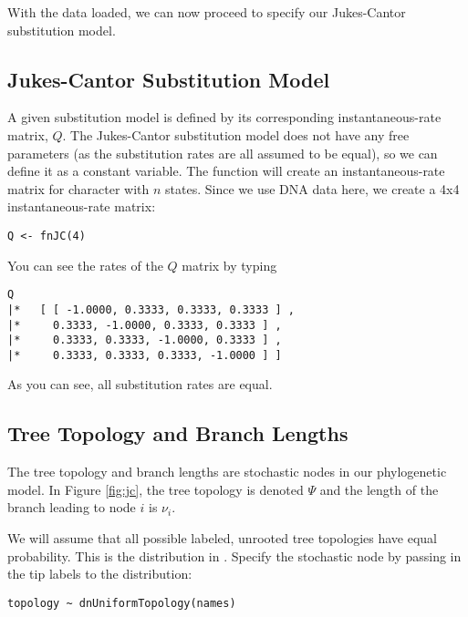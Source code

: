 With the data loaded, we can now proceed to specify our Jukes-Cantor substitution model.

\subsection{Jukes-Cantor Substitution Model}

A given substitution model is defined by its corresponding instantaneous-rate matrix, $Q$.
The Jukes-Cantor substitution model does not have any free parameters (as the substitution rates are all assumed to be equal), so we can define it as a constant variable.
The function  will create an instantaneous-rate matrix for character with $n$ states.
Since we use DNA data here, we create a 4x4 instantaneous-rate matrix:
{\tt \begin{snugshade*}
\begin{lstlisting}
Q <- fnJC(4) 
\end{lstlisting}
\end{snugshade*}}
You can see the rates of the $Q$ matrix by typing
{\tt \begin{snugshade*}
\begin{lstlisting}
Q
|*   [ [ -1.0000, 0.3333, 0.3333, 0.3333 ] ,
|*     0.3333, -1.0000, 0.3333, 0.3333 ] ,
|*     0.3333, 0.3333, -1.0000, 0.3333 ] ,
|*     0.3333, 0.3333, 0.3333, -1.0000 ] ]
\end{lstlisting}
\end{snugshade*}}
As you can see, all substitution rates are equal.


\subsection{Tree Topology and Branch Lengths}

The tree topology and branch lengths are stochastic nodes in our phylogenetic model. 
In Figure \ref{fig:jc}, the tree topology is denoted $\Psi$ and the length of the branch leading to node $i$ is $\nu_i$.

We will assume that all possible labeled, unrooted tree topologies have equal probability. This is the  distribution in \RevBayes. Specify the  stochastic node by passing in the tip labels  to the  distribution:
{\tt \begin{snugshade*}
\begin{lstlisting}
topology ~ dnUniformTopology(names)
\end{lstlisting}
\end{snugshade*}}

